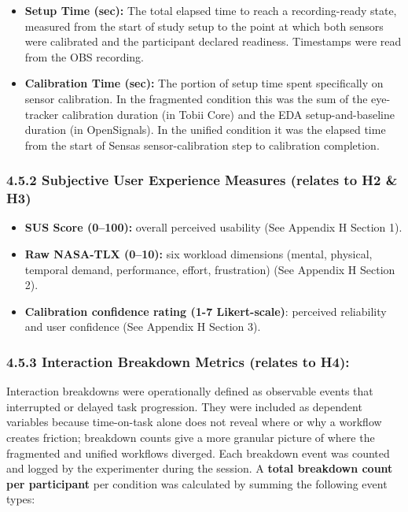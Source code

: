\documentclass[
]{article}
\begin{document}
\begin{itemize}
\item
  \textbf{Setup Time (sec):} The total elapsed time to reach a recording-ready state, measured from the start of study setup to the point at which both sensors were calibrated and the participant declared readiness. Timestamps were read from the OBS recording.
\item
  \textbf{Calibration Time (sec):} The portion of setup time spent specifically on sensor calibration. In the fragmented condition this was the sum of the eye-tracker calibration duration (in Tobii Core) and the EDA setup-and-baseline duration (in OpenSignals). In the unified condition it was the elapsed time from the start of Sensa\textquotesingle s sensor-calibration step to calibration completion.
\end{itemize}

\hypertarget{subjective-user-experience-measures-relates-to-h2-h3}{%
\subsubsection{4.5.2 Subjective User Experience Measures (relates to H2 \& H3)}\label{subjective-user-experience-measures-relates-to-h2-h3}}

\begin{itemize}
\item
  \textbf{SUS Score (0--100):} overall perceived usability (See Appendix H Section 1).
\item
  \textbf{Raw NASA-TLX (0--10):} six workload dimensions (mental, physical, temporal demand, performance, effort, frustration) (See Appendix H Section 2).
\item
  \textbf{Calibration confidence rating (1-7 Likert-scale)}: perceived reliability and user confidence (See Appendix H Section 3).
\end{itemize}

\hypertarget{interaction-breakdown-metrics-relates-to-h4}{%
\subsubsection{\texorpdfstring{4.5.3 Interaction Breakdown Metrics (relates to H4): }{4.5.3 Interaction Breakdown Metrics (relates to H4): }}\label{interaction-breakdown-metrics-relates-to-h4}}

Interaction breakdowns were operationally defined as observable events that interrupted or delayed task progression. They were included as dependent variables because time-on-task alone does not reveal where or why a workflow creates friction; breakdown counts give a more granular picture of where the fragmented and unified workflows diverged. Each breakdown event was counted and logged by the experimenter during the session. A \textbf{total breakdown count per participant} per condition was calculated by summing the following event types:
\end{document}
